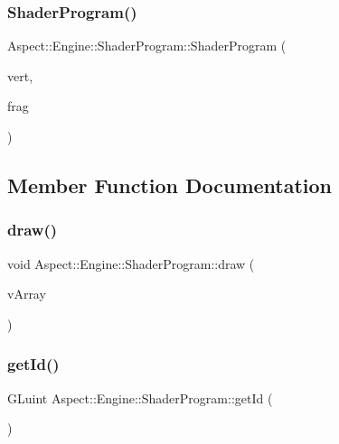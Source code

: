 \subsubsection{\texorpdfstring{Shader\+Program()}{ShaderProgram()}}
{\footnotesize\ttfamily Aspect\+::\+Engine\+::\+Shader\+Program\+::\+Shader\+Program (\begin{DoxyParamCaption}\item[{std\+::string}]{vert,  }\item[{std\+::string}]{frag }\end{DoxyParamCaption})}



\subsection{Member Function Documentation}
\mbox{\label{class_aspect_1_1_engine_1_1_shader_program_a4ecfbdda05fbfb1d5a36f6d584dd0ef2}} 
\subsubsection{\texorpdfstring{draw()}{draw()}}
{\footnotesize\ttfamily void Aspect\+::\+Engine\+::\+Shader\+Program\+::draw (\begin{DoxyParamCaption}\item[{std\+::shared\+\_\+ptr$<$ \mbox{\hyperlink{class_aspect_1_1_engine_1_1_vertex_array}{Vertex\+Array}} $>$}]{v\+Array }\end{DoxyParamCaption})}

\mbox{\label{class_aspect_1_1_engine_1_1_shader_program_a78a54e4a39c3e605f7a5832e6ce7f692}} 
\subsubsection{\texorpdfstring{get\+Id()}{getId()}}
{\footnotesize\ttfamily G\+Luint Aspect\+::\+Engine\+::\+Shader\+Program\+::get\+Id (\begin{DoxyParamCaption}{ }\end{DoxyParamCaption})}

